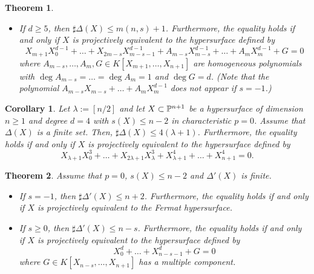 \documentclass[10pt,oneside]{amsart}
\newtheorem{theorem}{Theorem}
\newtheorem{corollary}{Corollary}
\theoremstyle{definition}
\begin{document}
\begin{theorem}
\begin{itemize}
\begin{itemize}
where $s=2$ and $G_1 \in K[X_{2m-2s}, \ldots, X_{n+1}]$ has a multiple component; or  
\item[(ii)] $ X_{m+1}X_0^3+\dots+X_{2m-s-1}X_{m-s-2}^3+X_{2m-s}X_{m-s-1}^3+A_{m-s}X_{m-s}\dots+A_mX_m^3$ \\
\hspace{75mm} $+X_{m+1}^4+\dots+X_{2m-s-1}^4+G_2 =0 $ \\    
where $s \ge 2$ and $A_{m-s}, \ldots, A_m, G_2 \in K[X_{2m-s}, X_{n+1}]$. 
\end{itemize} 
\item[(II)] If $d \ge 5$, then 
$ \sharp \Delta(X) \le m(n,s)+1$.  
Furthermore, the equality holds if and only if $X$ is projectively equivalent to the hypersurface defined by 
$$ X_{m+1}X_0^{d-1}+\dots+X_{2m-s}X_{m-s-1}^{d-1}+A_{m-s}X_{m-s}^{d-1}+\dots+A_mX_m^{d-1}+G=0 $$
where $A_{m-s}, \ldots, A_m, G \in K[X_{m+1}, \ldots, X_{n+1}]$ are homogeneous polynomials with $\deg A_{m-s}=\dots=\deg A_m=1$ and $\deg G=d$.  
(Note that the polynomial $A_{m-s}X_{m-s}+\dots+A_{m}X_m^{d-1}$ does not appear if $s=-1$.) 
\end{itemize} 
\end{theorem} 

\begin{corollary} 
Let $\lambda:=[n/2]$ and 
let $X \subset \Bbb P^{n+1}$ be a hypersurface of dimension $n \ge 1$ and degree $d = 4$ with $s(X) \le n-2$ in characteristic $p=0$. 
Assume that $\Delta(X)$ is a finite set. 
Then, $\sharp\Delta(X) \le 4(\lambda+1)$. 
Furthermore, the equality holds if and only if $X$ is projectively equivalent to the hypersurface defined by 
$$ X_{\lambda+1}X_0^3+\dots+X_{2\lambda+1}X_{\lambda}^3+X_{\lambda+1}^4+\dots+X_{n+1}^4=0.$$ 
\end{corollary} 

\begin{theorem} \label{OuterGalois}
Assume that $p=0$, $s(X) \le n-2$ and $\Delta'(X)$ is finite. 
\begin{itemize}
\item[(1)] If $s=-1$, then $\sharp\Delta'(X) \le n+2$. 
Furthermore, the equality holds if and only if $X$ is projectively equivalent to the Fermat hypersurface. 
\item[(2)] If $s \ge 0$, then $\sharp\Delta'(X) \le n-s$. 
Furthermore, the equality holds if and only if $X$ is projectively equivalent to the hypersurface defined by 
$$ X_0^d+\dots+X_{n-s-1}^d+G=0 $$
where $G \in K[X_{n-s}, \ldots, X_{n+1}]$ has a multiple component.  
\end{itemize} 
\end{theorem}
\end{document}
